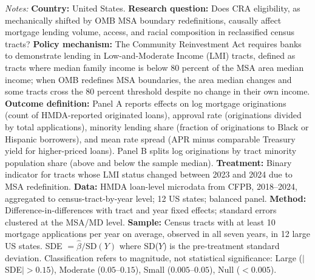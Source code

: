 \begin{table}[htbp]
\begin{threeparttable}
\begin{tablenotes}[flushleft]
\item \textit{Notes:} \textbf{Country:} United States. \textbf{Research question:} Does CRA eligibility, as mechanically shifted by OMB MSA boundary redefinitions, causally affect mortgage lending volume, access, and racial composition in reclassified census tracts? \textbf{Policy mechanism:} The Community Reinvestment Act requires banks to demonstrate lending in Low-and-Moderate Income (LMI) tracts, defined as tracts where median family income is below 80 percent of the MSA area median income; when OMB redefines MSA boundaries, the area median changes and some tracts cross the 80 percent threshold despite no change in their own income. \textbf{Outcome definition:} Panel A reports effects on log mortgage originations (count of HMDA-reported originated loans), approval rate (originations divided by total applications), minority lending share (fraction of originations to Black or Hispanic borrowers), and mean rate spread (APR minus comparable Treasury yield for higher-priced loans). Panel B splits log originations by tract minority population share (above and below the sample median). \textbf{Treatment:} Binary indicator for tracts whose LMI status changed between 2023 and 2024 due to MSA redefinition. \textbf{Data:} HMDA loan-level microdata from CFPB, 2018--2024, aggregated to census-tract-by-year level; 12 US states; balanced panel. \textbf{Method:} Difference-in-differences with tract and year fixed effects; standard errors clustered at the MSA/MD level. \textbf{Sample:} Census tracts with at least 10 mortgage applications per year on average, observed in all seven years, in 12 large US states. SDE $= \hat{\beta} / \text{SD}(Y)$ where SD($Y$) is the pre-treatment standard deviation. Classification refers to magnitude, not statistical significance: Large ($|$SDE$| > 0.15$), Moderate ($0.05$--$0.15$), Small ($0.005$--$0.05$), Null ($< 0.005$).
\end{tablenotes}
\end{threeparttable}
\end{table}
